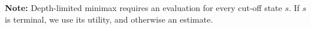 \documentclass{stex}
\begin{document}

\textbf{Note:} Depth-limited minimax requires an
evaluation for every cut-off state $s$.
If $s$ is terminal, we use its utility, and otherwise an estimate.
\end{document}
